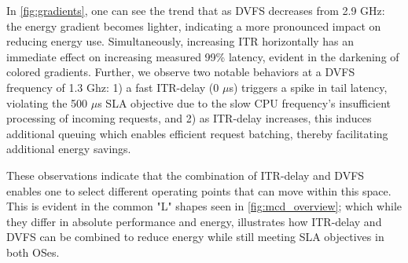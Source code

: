 In \cref{fig:gradients}, one can see the trend that as DVFS decreases from 2.9 GHz: the energy gradient becomes lighter, indicating a more pronounced impact on reducing energy use. Simultaneously, increasing ITR horizontally has an immediate effect on increasing measured 99\% latency, evident in the darkening of colored gradients. Further, we observe two notable behaviors at a DVFS frequency of 1.3 Ghz: 1) a fast ITR-delay (0 $\mu$s) triggers a spike in tail latency, violating the 500 $\mu$s SLA objective due to the slow CPU frequency's insufficient processing of incoming requests, and 2) as ITR-delay increases, this induces additional queuing which enables efficient request batching, thereby facilitating additional energy savings. 

These observations indicate that the combination of ITR-delay and DVFS enables one to select different operating points that can move within this space. This is evident in the common "L" shapes seen in \cref{fig:mcd_overview}; which while they differ in absolute performance and energy, illustrates how ITR-delay and DVFS can be combined to reduce energy while still meeting SLA objectives in both OSes.